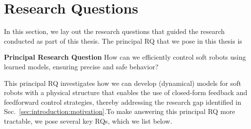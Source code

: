 \section{Research Questions}\label{sec:introduction:research_questions}
In this section, we lay out the research questions that guided the research conducted as part of this thesis.
The principal \gls{RQ} that we pose in this thesis is
\begin{titled-frame}{\textbf{Principal Research Question}}
\noindent How can we efficiently control soft robots using learned models, ensuring precise and safe behavior?
\end{titled-frame}
This principal \gls{RQ} investigates how we can develop (dynamical) models for soft robots with a physical structure that enables the use of closed-form feedback and feedforward control strategies, thereby addressing the research gap identified in Sec.~\ref{sec:introduction:motivation}.To make answering this principal \gls{RQ} more tractable, we pose several key \glspl{RQ}, which we list below.

